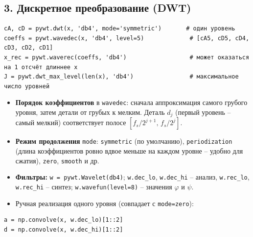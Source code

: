 \documentclass[12pt,a4paper,openany]{book}
\providecommand{\tightlist}{\setlength{\itemsep}{0pt}\setlength{\parskip}{0pt}}
\begin{document}
\subsection*{3. Дискретное преобразование (DWT)}

\begin{Verbatim}[fontsize=\small, breaklines, breakanywhere]
cA, cD = pywt.dwt(x, 'db4', mode='symmetric')       # один уровень
coeffs = pywt.wavedec(x, 'db4', level=5)             # [cA5, cD5, cD4, cD3, cD2, cD1]
x_rec = pywt.waverec(coeffs, 'db4')                  # может оказаться на 1 отсчёт длиннее x
J = pywt.dwt_max_level(len(x), 'db4')                # максимальное число уровней
\end{Verbatim}

\begin{itemize}
\tightlist
\item
  \textbf{Порядок коэффициентов} в \texttt{wavedec}: сначала аппроксимация самого грубого уровня, затем детали от грубых к мелким. Деталь \(d_j\) (первый уровень -- самый мелкий) соответствует полосе \([f_s/2^{j+1},\, f_s/2^j]\).
\item
  \textbf{Режим продолжения} \texttt{mode}: \texttt{\textquotesingle{}\allowbreak{}symmetric\textquotesingle{}\allowbreak{}} (по умолчанию), \texttt{\textquotesingle{}\allowbreak{}periodization\textquotesingle{}\allowbreak{}} (длина коэффициентов ровно вдвое меньше на каждом уровне -- удобно для сжатия), \texttt{\textquotesingle{}\allowbreak{}zero\textquotesingle{}\allowbreak{}}, \texttt{\textquotesingle{}\allowbreak{}smooth\textquotesingle{}\allowbreak{}} и др.
\item
  \textbf{Фильтры:} \texttt{w\ =\allowbreak{}\ pywt.\allowbreak{}Wavelet(\allowbreak{}\textquotesingle{}\allowbreak{}db4\textquotesingle{}\allowbreak{})}; \texttt{w.\allowbreak{}dec\_\allowbreak{}lo}, \texttt{w.\allowbreak{}dec\_\allowbreak{}hi} -- анализ, \texttt{w.\allowbreak{}rec\_\allowbreak{}lo}, \texttt{w.\allowbreak{}rec\_\allowbreak{}hi} -- синтез; \texttt{w.\allowbreak{}wavefun(\allowbreak{}level=\allowbreak{}8)} -- значения \(\varphi\) и \(\psi\).
\item
  Ручная реализация одного уровня (совпадает с \texttt{mode=\allowbreak{}\textquotesingle{}\allowbreak{}zero\textquotesingle{}\allowbreak{}}):
\end{itemize}

\begin{Verbatim}[fontsize=\small, breaklines, breakanywhere]
a = np.convolve(x, w.dec_lo)[1::2]
d = np.convolve(x, w.dec_hi)[1::2]
\end{Verbatim}
\end{document}
